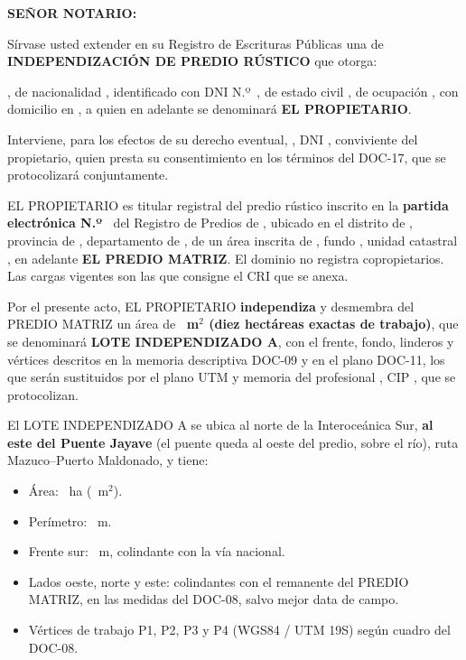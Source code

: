 \documentclass[12pt,a4paper]{article}
\begin{document}


\noindent \textbf{SEÑOR NOTARIO:}

\vspace{0.25em}
\noindent Sírvase usted extender en su Registro de Escrituras Públicas una de \textbf{INDEPENDIZACIÓN DE PREDIO RÚSTICO} que otorga:

\vspace{0.2em}
\noindent \textbf{\VendedorNombreCompleto}, de nacionalidad \VendedorNacionalidad, identificado con DNI N.º\ \VendedorDNI, de estado civil \VendedorEstadoCivil, de ocupación \VendedorOcupacion, con domicilio en \VendedorDomicilio, a quien en adelante se denominará \textbf{EL PROPIETARIO}.

\vspace{0.15em}
\noindent Interviene, para los efectos de su derecho eventual, \textbf{\ConvivienteNombre}, DNI \ConvivienteDNI, conviviente del propietario, quien presta su consentimiento en los términos del DOC-17, que se protocolizará conjuntamente.

EL PROPIETARIO es titular registral del predio rústico inscrito en la \textbf{partida electrónica N.º\ \PartidaMatriz} del Registro de Predios de \OficinaRegistral, ubicado en el distrito de \Distrito, provincia de \Provincia, departamento de \Departamento, de un área inscrita de \AreaMatriz, fundo \NombreFundo, unidad catastral \UnidadCatastral, en adelante \textbf{EL PREDIO MATRIZ}. El dominio no registra copropietarios. Las cargas vigentes son las que consigne el CRI que se anexa.

Por el presente acto, EL PROPIETARIO \textbf{independiza} y desmembra del PREDIO MATRIZ un área de \textbf{\AreaIndependizarMetros\ m$^2$ (diez hectáreas exactas de trabajo)}, que se denominará \textbf{LOTE INDEPENDIZADO A}, con el frente, fondo, linderos y vértices descritos en la memoria descriptiva DOC-09 y en el plano DOC-11, los que serán sustituidos por el plano UTM y memoria del profesional \IngenieroNombre, CIP \IngenieroCIP, que se protocolizan.

El LOTE INDEPENDIZADO A se ubica al norte de la Interoceánica Sur, \textbf{al este del Puente Jayave} (el puente queda al oeste del predio, sobre el río), ruta Mazuco--Puerto Maldonado, y tiene:

\begin{itemize}[leftmargin=1.15cm]
\item Área: \AreaIndependizarHa\ ha (\AreaIndependizarMetros\ m$^2$).
\item Perímetro: \PerimetroM\ m.
\item Frente sur: \FrenteM\ m, colindante con la vía nacional.
\item Lados oeste, norte y este: colindantes con el remanente del PREDIO MATRIZ, en las medidas del DOC-08, salvo mejor data de campo.
\item Vértices de trabajo P1, P2, P3 y P4 (WGS84 / UTM 19S) según cuadro del DOC-08.
\end{itemize}
\end{document}

